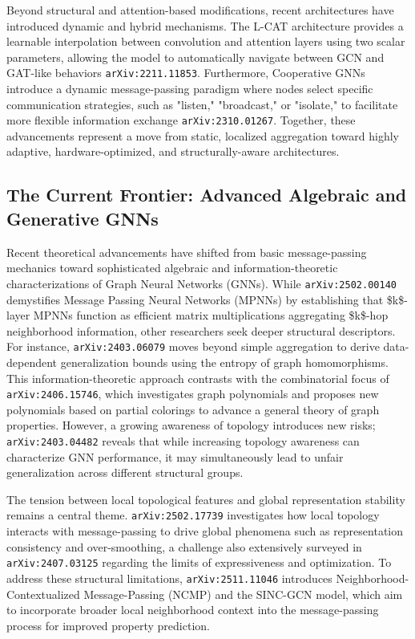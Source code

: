 \documentclass[11pt]{article}
\begin{document}
Beyond structural and attention-based modifications, recent architectures have introduced dynamic and hybrid mechanisms. The L-CAT architecture provides a learnable interpolation between convolution and attention layers using two scalar parameters, allowing the model to automatically navigate between GCN and GAT-like behaviors \texttt{arXiv:2211.11853}. Furthermore, Cooperative GNNs introduce a dynamic message-passing paradigm where nodes select specific communication strategies, such as "listen," "broadcast," or "isolate," to facilitate more flexible information exchange \texttt{arXiv:2310.01267}. Together, these advancements represent a move from static, localized aggregation toward highly adaptive, hardware-optimized, and structurally-aware architectures.

\subsection{The Current Frontier: Advanced Algebraic and Generative GNNs}

Recent theoretical advancements have shifted from basic message-passing mechanics toward sophisticated algebraic and information-theoretic characterizations of Graph Neural Networks (GNNs). While \texttt{arXiv:2502.00140} demystifies Message Passing Neural Networks (MPNNs) by establishing that \$k\$-layer MPNNs function as efficient matrix multiplications aggregating \$k\$-hop neighborhood information, other researchers seek deeper structural descriptors. For instance, \texttt{arXiv:2403.06079} moves beyond simple aggregation to derive data-dependent generalization bounds using the entropy of graph homomorphisms. This information-theoretic approach contrasts with the combinatorial focus of \texttt{arXiv:2406.15746}, which investigates graph polynomials and proposes new polynomials based on partial colorings to advance a general theory of graph properties. However, a growing awareness of topology introduces new risks; \texttt{arXiv:2403.04482} reveals that while increasing topology awareness can characterize GNN performance, it may simultaneously lead to unfair generalization across different structural groups.

The tension between local topological features and global representation stability remains a central theme. \texttt{arXiv:2502.17739} investigates how local topology interacts with message-passing to drive global phenomena such as representation consistency and over-smoothing, a challenge also extensively surveyed in \texttt{arXiv:2407.03125} regarding the limits of expressiveness and optimization. To address these structural limitations, \texttt{arXiv:2511.11046} introduces Neighborhood-Contextualized Message-Passing (NCMP) and the SINC-GCN model, which aim to incorporate broader local neighborhood context into the message-passing process for improved property prediction.
\end{document}
